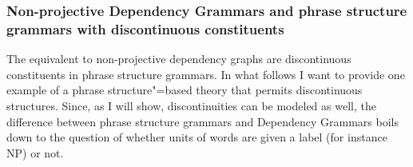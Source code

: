 \subsubsection{Non-projective Dependency Grammars and phrase structure grammars with discontinuous constituents}
\label{sec-discontinuous-constituents-HPSG}

The equivalent to non-projective dependency graphs are discontinuous constituents in phrase
structure grammars. In what follows I want to provide one
example of a phrase structure"=based theory that permits discontinuous structures. Since, as I
will show, discontinuities can be modeled as well, the difference between phrase structure grammars
and Dependency Grammars boils down to the question of whether units of words are given a label (for
instance NP) or not.

